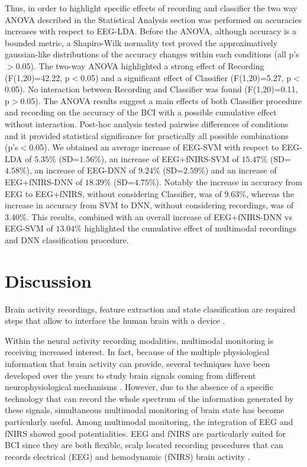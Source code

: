 \documentclass[12pt]{iopart}
\begin{document}
Thus, in order to highlight specific effects of recording and classifier the two way ANOVA described in the Statistical Analysis section was performed on accuracies increases with respect to EEG-LDA. Before the ANOVA, although accuracy is a bounded metric, a Shapiro-Wilk normality test proved the approximatively gaussian-like distributions of the accuracy changes within each conditions (all p's$>$0.05).
The two-way ANOVA highlighted a strong effect of Recording (F(1,20)=42.22, p$<$0.05) and a significant effect of Classifier (F(1,20)=5.27, p$<$0.05). No interaction between Recording and Classifier was found (F(1,20)=0.11, p$>$0.05). The ANOVA results suggest a main effects of both Classifier procedure and recording on the accuracy of the BCI with a possible cumulative effect without interaction.
Post-hoc analysis tested pairwise differences  of conditions and it provided statistical significance for practically  all possible combinations (p's$<$0.05).
We obtained an average increase of EEG-SVM with respect to EEG-LDA of $5.35\%$ (SD=$1.56\%$), an increase of EEG+fNIRS-SVM of $15.47\%$ (SD=$4.58\%$), an increase of EEG-DNN of $9.24\%$ (SD=$2.59\%$) and an increase of EEG+fNIRS-DNN of $18.39\%$ (SD=$4.75\%$). Notably the increase in accuracy from EEG to EEG+fNIRS, without considering Classifier, was of $9.63\%$, whereas the increase in accuracy from SVM to DNN, without considering recordings, was of  $3.40\%$. This results, combined with an overall increase of EEG+fNIRS-DNN vs EEG-SVM of  $13.04\%$ highlighted the cumulative effect of multimodal recordings and DNN classification procedure.

\section{Discussion}
 Brain activity recordings, feature extraction and state classification are required steps that allow to interface the human brain with a device \parencite{wolpaw2000brain}. 
 
	 Within the neural activity recording modalities, multimodal monitoring is receiving increased interest. In fact, because of the multiple physiological information that brain activity can provide, several techniques have been developed over the years to study brain signals coming from different neurophysiological mechanisms \parencite{pfurtscheller2010hybrid,fazli2012enhanced,khan2014decoding,hong2015classification,croce2016eeg}. However, due to the absence of a specific technology that can record the whole spectrum of the information generated by these signals, simultaneous multimodal monitoring of brain state has become particularly useful. Among multimodal monitoring, the integration  of EEG and  fNIRS showed good potentialities. EEG and fNIRS are particularly suited for BCI since they are both flexible, scalp located recording procedures that can records  electrical  (EEG) and hemodynamic (fNIRS) brain activity \parencite{chiarelli2017simultaneous} . 
 
\end{document}
